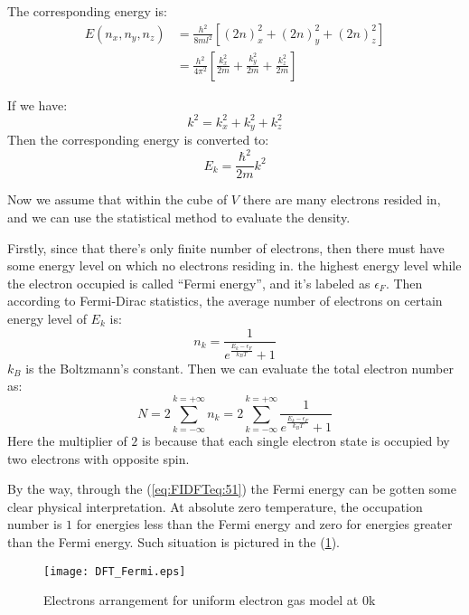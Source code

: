 The corresponding energy is:
\begin{align}\label{eq:FIDFTeq:20}
E(n_{x}, n_{y}, n_{z}) &= \frac{h^{2}}{8ml^{2}}[(2n)^{2}_{x} +
(2n)^{2}_{y} + (2n)^{2}_{z}] \nonumber \\
&=\frac{h^{2}}{4\pi^{2}}\left[\frac{k_{x}^{2}}{2m} +
\frac{k_{y}^{2}}{2m} + \frac{k_{z}^{2}}{2m}\right]
\end{align}

If we have:
\begin{equation}
  \label{eq:FIDFTeq:49}
  k^{2} = k_{x}^{2} + k_{y}^{2} + k_{z}^{2}
\end{equation}
Then the corresponding energy is converted to:
\begin{equation}
  \label{eq:FIDFTeq:50}
  E_{k} = \frac{\hbar^{2}}{2m}k^{2}
\end{equation}

Now we assume that within the cube of $V$ there are many electrons
resided in, and we can use the statistical method to evaluate the
density.

Firstly, since that there's only finite number of electrons, then
there must have some energy level on which no electrons residing
in. the highest energy level while the electron occupied is called
``Fermi energy'', and it's labeled as $\epsilon_{F}$. Then according
to Fermi-Dirac statistics, the average number of electrons on
certain energy level of $E_{k}$ is:
\begin{equation}
  \label{eq:FIDFTeq:51}
  n_{k} = \frac{1}{e^{\frac{E_{k}-\epsilon_{F}}{k_{B}T}} + 1}
\end{equation}
$k_{B}$ is the Boltzmann's constant. Then we can evaluate the total
electron number as:
\begin{equation}
  \label{eq:FIDFTeq:52}
  N= 2\sum_{k=-\infty}^{k=+\infty}n_{k} =
  2\sum_{k=-\infty}^{k=+\infty}\frac{1}{e^{\frac{E_{k}-\epsilon_{F}}{k_{B}T}}
    + 1}
\end{equation}
Here the multiplier of $2$ is because that each single electron state
is occupied by two electrons with opposite spin.

By the way, through the (\ref{eq:FIDFTeq:51}) the Fermi energy can be
gotten some clear physical interpretation. At absolute zero
temperature, the occupation number is $1$ for energies less than the Fermi
energy and zero for energies greater than the Fermi energy. Such
situation is pictured in the (\ref{FIDFT:1}).

\begin{figure}
\begin{center}
\texttt{[image: DFT\_Fermi.eps]}
\caption{Electrons arrangement for uniform electron gas model at $0$k}
\label{FIDFT:1}
\end{center}
\end{figure}

